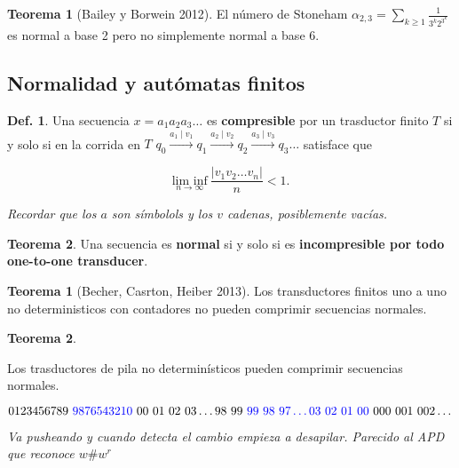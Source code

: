 \documentclass{report}
\theoremstyle{definition} %
\newtheorem{theorem}{Teorema}
\newtheorem*{theorem*}{Teorema}
\newtheorem{definition}{Def.}
\begin{document}
\begin{theorem}[Bailey y Borwein 2012]
    El número de Stoneham $\alpha_{2, 3} = \sum_{k \geq 1} \frac{1}{3^k
    2^{3^k}}$ es normal a base 2 pero no simplemente normal a base 6.
\end{theorem}

\subsection{Normalidad y autómatas finitos}

\begin{definition}
    Una secuencia $x = a_1 a_2 a_3 \dots$ es \textbf{compresible} por un
    trasductor finito $T$ si y solo si en la corrida en $T$ $q_0
    \xrightarrow{a_1\mid v_1} q_1 \xrightarrow{a_2\mid v_2} q_2
    \xrightarrow{a_3\mid v_3} q_3 \dots$ satisface que

    $$\underset{n \to \infty}{\text{lim inf}}\ \frac{|v_1 v_2 \dots v_n|}{n} <
    1.$$
    
    \textit{Recordar que los $a$ son símbolols y los $v$ cadenas, posiblemente vacías.}
\end{definition}

\begin{theorem}
    Una secuencia es \textbf{normal} si y solo si es \textbf{incompresible por
    todo one-to-one transducer}.
\end{theorem}

\begin{theorem*}[Becher, Casrton, Heiber 2013]
    Los transductores finitos uno a uno no deterministicos con contadores no
    pueden comprimir secuencias normales.
\end{theorem*}

\begin{theorem*}
    
\end{theorem*}
    Los trasductores de pila no determinísticos pueden comprimir secuencias
    normales.
    
    $$
        0123456789\ \textcolor{blue}{9876543210}\
        00\ 01\ 02\ 03 \dots 98\ 99\ \textcolor{blue}{99\ 98\ 97 \dots 03\ 02\ 01\ 00\ }
        000\ 001\ 002 \dots
    $$

    \textit{Va pusheando y cuando detecta el cambio empieza a desapilar.
    Parecido al APD que reconoce $w\#w^r$}
\end{document}
